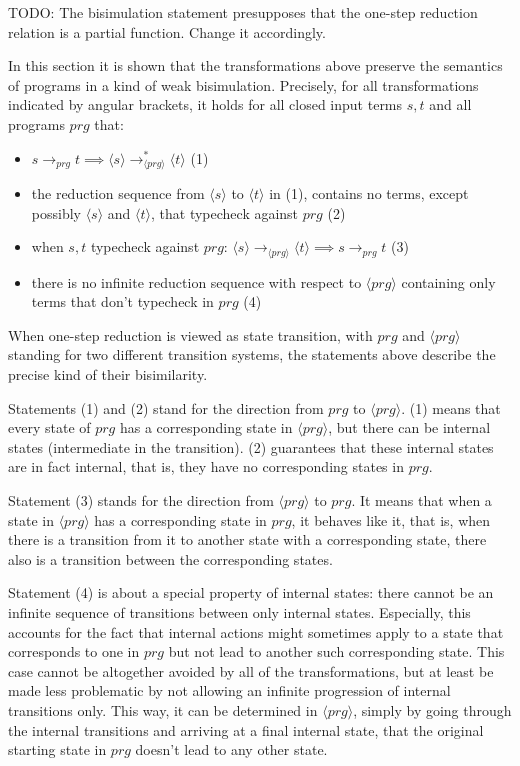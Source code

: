 \documentclass[11pt]{article} %
\begin{document}
TODO: The bisimulation statement presupposes that the one-step reduction relation is a partial function. Change it accordingly.

In this section it is shown that the transformations above preserve the semantics of programs in a kind of weak bisimulation. Precisely, for all transformations indicated by angular brackets, it holds for all closed input terms $s, t$ and all programs $prg$ that:

\begin{itemize}
\item $s \longrightarrow_{prg} t \implies \langle s \rangle \longrightarrow_{\langle prg \rangle}^* \langle t \rangle$ (1)

\item the reduction sequence from $\langle s \rangle$ to $\langle t \rangle$ in (1), contains no terms, except possibly $\langle s \rangle$ and $\langle t \rangle$, that typecheck against $prg$ (2)

\item when $s, t$ typecheck against $prg$: $\langle s \rangle \longrightarrow_{\langle prg \rangle} \langle t \rangle \implies s \longrightarrow_{prg} t$ (3)

\item there is no infinite reduction sequence with respect to $\langle prg \rangle$ containing only terms that don't typecheck in $prg$ (4)

\end{itemize}

When one-step reduction is viewed as state transition, with $prg$ and $\langle prg \rangle$ standing for two different transition systems, the statements above describe the precise kind of their bisimilarity.

Statements (1) and (2) stand for the direction from $prg$ to $\langle prg \rangle$. (1) means that every state of $prg$ has a corresponding state in $\langle prg \rangle$, but there can be internal states (intermediate in the transition). (2) guarantees that these internal states are in fact internal, that is, they have no corresponding states in $prg$.

Statement (3) stands for the direction from $\langle prg \rangle$ to $prg$. It means that when a state in $\langle prg \rangle$ has a corresponding state in $prg$, it behaves like it, that is, when there is a transition from it to another state with a corresponding state, there also is a transition between the corresponding states.

Statement (4) is about a special property of internal states: there cannot be an infinite sequence of transitions between only internal states. Especially, this accounts for the fact that internal actions might sometimes apply to a state that corresponds to one in $prg$ but not lead to another such corresponding state. This case cannot be altogether avoided by all of the transformations, but at least be made less problematic by not allowing an infinite progression of internal transitions only. This way, it can be determined in $\langle prg \rangle$, simply by going through the internal transitions and arriving at a final internal state, that the original starting state in $prg$ doesn't lead to any other state.
\end{document}
